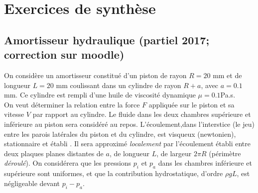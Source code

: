 



\section{Exercices de synthèse }


\setcounter{subsection}{-1}

\subsection{Amortisseur hydraulique (partiel 2017; correction sur moodle)}

On consid\`ere un amortisseur constitu\'e d'un piston de rayon $R=20$ mm et de longueur $L=20$ mm coulissant dans un cylindre de rayon $R+a$, avec $a =0.1$ mm. Ce cylindre est rempli d'une huile de viscosit\'e dynamique $\mu=0.1$Pa.s.\\
On veut d\'eterminer la relation entre la force $F$ appliqu\'ee sur le piston et sa vitesse $V$ par rapport au cylindre. Le fluide dans les deux chambres sup\'erieure et inf\'erieure au piston sera consid\'er\'e au repos. L'\'ecoulement,dans l'interstice (le jeu) entre les parois lat\'erales du piston et du cylindre, est visqueux (newtonien), stationnaire et \'etabli . Il sera approxim\'e \textit{localement} par l'\'ecoulement \'etabli entre deux plaques planes distantes de $a$, de longueur $L$, de largeur $2\pi R$ (p\'erim\`etre {\it d\'eroul\'e}). On consid\'erera que les pressions $p_i$ et $p_a$ dans les chambres inf\'erieure et sup\'erieure sont uniformes, et que la contribution hydrostatique, d'ordre $\rho gL$, est n\'egligeable devant $p_i-p_a$.\\


